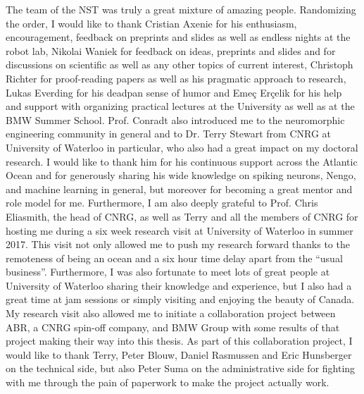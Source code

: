 The team of the \acl{NST} was truly a great mixture of amazing people.
Randomizing the order, I would like to thank Cristian Axenie for his enthusiasm, encouragement, feedback on preprints and slides as well as endless nights at the robot lab, Nikolai Waniek for feedback on ideas, preprints and slides and for discussions on scientific as well as any other topics of current interest, Christoph Richter for proof-reading papers as well as his pragmatic approach to research, Lukas Everding for his deadpan sense of humor and Eme\c{c} Er\c{c}elik for his help and support with organizing practical lectures at the University as well as at the BMW Summer School.
Prof. Conradt also introduced me to the neuromorphic engineering community in general and to Dr. Terry Stewart from \ac{CNRG} at University of Waterloo in particular, who also had a great impact on my doctoral research.
I would like to thank him for his continuous support across the Atlantic Ocean and for generously sharing his wide knowledge on spiking neurons, Nengo, and machine learning in general, but moreover for becoming a great mentor and role model for me.
Furthermore, I am also deeply grateful to Prof. Chris Eliasmith, the head of \ac{CNRG}, as well as Terry and all the members of \ac{CNRG} for hosting me during a six week research visit at University of Waterloo in summer 2017.
This visit not only allowed me to push my research forward thanks to the remoteness of being an ocean and a six hour time delay apart from the \enquote{usual business}.
Furthermore, I was also fortunate to meet lots of great people at University of Waterloo sharing their knowledge and experience, but I also had a great time at jam sessions or simply visiting and enjoying the beauty of Canada.
My research visit also allowed me to initiate a collaboration project between \ac{ABR}, a \ac{CNRG} spin-off company, and BMW Group with some results of that project making their way into this thesis.
As part of this collaboration project, I would like to thank Terry, Peter Blouw, Daniel Rasmussen and Eric Hunsberger on the technical side, but also Peter Suma on the administrative side for fighting with me through the pain of paperwork to make the project actually work.

